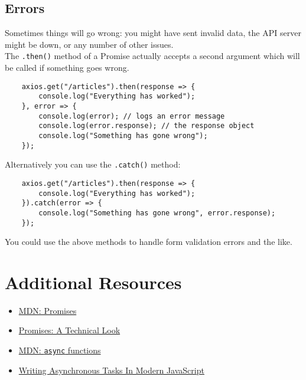 \subsection{Errors}

Sometimes things will go wrong: you might have sent invalid data, the API server might be down, or any number of other issues.
\\

The \texttt{.then()} method of a Promise actually accepts a second argument which will be called if something goes wrong.

\begin{verbatim}
    axios.get("/articles").then(response => {
        console.log("Everything has worked");
    }, error => {
        console.log(error); // logs an error message
        console.log(error.response); // the response object
        console.log("Something has gone wrong");
    });
\end{verbatim}

Alternatively you can use the \texttt{.catch()} method:

\begin{verbatim}
    axios.get("/articles").then(response => {
        console.log("Everything has worked");
    }).catch(error => {
        console.log("Something has gone wrong", error.response);
    });
\end{verbatim}

You could use the above methods to handle form validation errors and the like.

\section{Additional Resources}

\begin{itemize}[leftmargin=*]
    \item \href{https://developer.mozilla.org/en-US/docs/Web/JavaScript/Reference/Global_Objects/Promise}{MDN: Promises}
    \item \href{http://exploringjs.com/es6/ch_promises.html}{Promises: A Technical Look}
    \item \href{https://developer.mozilla.org/en-US/docs/Web/JavaScript/Reference/Statements/async_function}{MDN: \texttt{async} functions}
    \item \href{https://www.smashingmagazine.com/2019/10/asynchronous-tasks-modern-javascript/}{Writing Asynchronous Tasks In Modern JavaScript}
\end{itemize}
